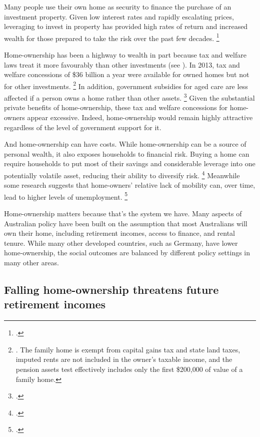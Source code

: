 Many people use their own home as security to finance the purchase of an investment property.
Given low interest rates and rapidly escalating prices, leveraging to invest in property has provided high rates of return and increased wealth for those prepared to take the risk over the past few decades.%
	\footcite{CrowleyLi2016}

Home-ownership has been a highway to wealth in part because tax and welfare laws treat it more favourably than other investments (see ).
In 2013, tax and welfare concessions of \$36 billion a year were available for owned homes but not for other investments.%
	\footnote{\textcite[][22--29]{KellyHarrisonHunterEtAl2013}.
	The family home is exempt from capital gains tax and state land taxes, imputed rents are not included in the owner's taxable income, and the pension assets test effectively includes only the first \$200,000 of value of a family home.}
In addition, government subsidies for aged care are less affected if a person owns a home rather than other assets.%
	\footcites{DSS-Exempting-Principal-Home-Care-situations}{OnePath-2013-Aged-care-and-the-former-home} %
Given the substantial private benefits of home-ownership, these tax and welfare concessions for home-owners appear excessive. 	Indeed, home-ownership would remain highly attractive regardless of the level of government support for it.

And home-ownership can have costs. While home-ownership can be a source of personal wealth, it also exposes households to financial risk. Buying a home can require households to put most of their savings and considerable leverage into one potentially volatile asset, reducing their ability to diversify risk.%
    \footcite[][8]{KellyHarrisonHunterEtAl2013}
Meanwhile some research suggests that home-owners' relative lack of mobility can, over time, lead to higher levels of unemployment.%
    \footcite[][8]{KellyHarrisonHunterEtAl2013}
    
Home-ownership matters because that's the system we have. Many aspects of Australian policy have been built on the assumption that most Australians will own their home, including retirement incomes, access to finance, and rental tenure. While many other developed countries, such as Germany, have lower home-ownership, the social outcomes are balanced by different policy settings in many other areas. 

\subsection{Falling home-ownership threatens future retirement incomes }\label{subsec:higher-housing-costs-and-falling-home-ownership-rates-threaten-future-retirement-incomes}

